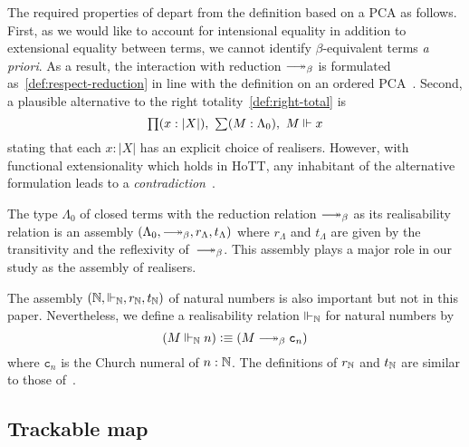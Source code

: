 \documentclass[a4paper,UKenglish,numberwithinsect,cleveref,thm-restate]{lipics-v2021}
\numberwithin{equation}{section}
\theoremstyle{plain}
\begin{document}
The required properties of  depart from the definition based on a PCA as follows. 
First, as we would like to account for intensional equality in addition to extensional equality between terms,
we cannot identify $\beta$-equivalent terms \emph{a priori}.
As a result, the interaction with reduction $\reduce$ is formulated as~\eqref{def:respect-reduction} in line with the definition on an ordered PCA~\cite[Section~2.3]{Hofstra2003}.
Second, a plausible alternative to the right totality~\eqref{def:right-total} is
\[
  \lprd{x : |X|} \lsm{M : \Lambda_0} M \Vdash x
\]
stating that each $x : |X|$ has an explicit choice of realisers.
However, with functional extensionality which holds in HoTT, any inhabitant of the alternative formulation leads to a \emph{contradiction}~\cite{Troelstra1977}. 

\begin{example}\label{ex:assembly-lambda}
  The type $\Lambda_0$ of closed terms with the reduction relation ${\reduce}$ as its realisability relation is an assembly $(\Lambda_0, \reduce, r_\Lambda, t_\Lambda)$ where $r_\Lambda$ and $t_\Lambda$ are given by the transitivity and the reflexivity of~$\reduce$.
  This assembly plays a major role in our study as the assembly of realisers.
\end{example}

\begin{example}
  The assembly $(\mathbb{N}, \Vdash_\mathbb{N}, r_{\mathbb{N}}, t_{\mathbb{N}})$ of natural numbers is also important but not in this paper.
  Nevertheless, we define a realisability relation $\Vdash_{\mathbb{N}}$ for natural numbers by
  \[
    \left(M \Vdash_\Nat n\right) \defeq \left(M \reduce \mathtt{c}_n\right)
  \]
  where $\mathtt{c}_n$ is the Church numeral of $n : \mathbb{N}$. The definitions of $r_\mathbb{N}$ and $t_\mathbb{N}$ are similar to those of~.  
\end{example}

\subsection{Trackable map}%
\end{document}
